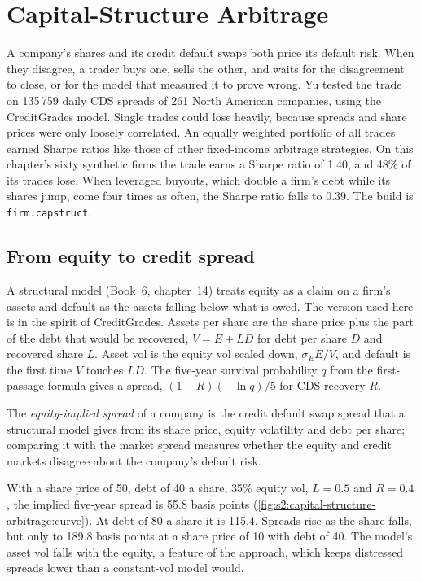 \chapter{Capital-Structure Arbitrage}\label{ch:s2:capital-structure-arbitrage}

A company's shares and its credit default swaps both price its default risk. When they disagree, a trader buys one, sells the other, and waits for the
disagreement to close, or for the model that measured it to prove wrong. Yu tested the trade on 135\,759 daily CDS spreads of 261 North American
companies, using the CreditGrades model. Single trades could lose heavily, because spreads and share prices were only loosely correlated. An equally
weighted portfolio of all trades earned Sharpe ratios like those of other fixed-income arbitrage strategies. On this chapter's sixty synthetic firms
the trade earns a Sharpe ratio of 1.40, and 48\% of its trades lose. When leveraged buyouts, which double a firm's debt while its shares jump, come
four times as often, the Sharpe ratio falls to 0.39. The build is \texttt{firm.capstruct}.

\section{From equity to credit spread}

A structural model (Book~6, chapter~14) treats equity as a claim on a firm's assets and default as the assets falling below what is owed. The version
used here is in the spirit of CreditGrades. Assets per share are the share price plus the part of the debt that would be recovered, $V = E + LD$ for
debt per share $D$ and recovered share $L$. Asset vol is the equity vol scaled down, $\sigma_E E/V$, and default is the first time $V$ touches $LD$.
The five-year survival probability $q$ from the first-passage formula gives a spread, $(1 - R)(-\ln q)/5$ for CDS recovery $R$.

\begin{definition}\label{def:s2:capital-structure-arbitrage:implied}
The \emph{equity-implied spread} of a company is the credit default swap spread that a structural model gives from its
share price, equity volatility and debt per share; comparing it with the market spread measures whether the equity and credit markets disagree about
the company's default risk.
\end{definition}

With a share price of 50, debt of 40 a share, 35\% equity vol, $L = 0.5$ and $R = 0.4$, the implied five-year spread is 55.8 basis points
(\cref{fig:s2:capital-structure-arbitrage:curve}). At debt of 80 a share it is 115.4. Spreads rise as the share falls, but only to 189.8 basis
points at a share price of 10 with debt of 40. The model's asset vol falls with the equity, a feature of the approach, which keeps distressed spreads
lower than a constant-vol model would.

